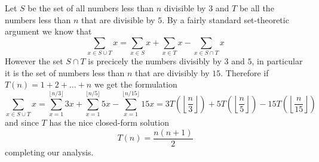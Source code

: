 Let $S$ be the set of all numbers less than $n$ divisible by $3$ and $T$ be all the numbers less than $n$ that are divisible by $5$.
By a fairly standard set-theoretic argument we know that
$$\sum_{x\in S\cup T} x=\sum_{x\in S} x+\sum_{x\in T} x-\sum_{x\in S\cap T} x$$
However the set $S\cap T$ is precicely the numbers divisibly by $3$ and $5$, in particular it is the set of numbers less than $n$ that
are divisibly by $15$. Therefore if $T(n)=1+2+\dots+n$ we get the formulation
$$\sum_{x\in S\cup T} x=\sum_{x=1}^{\lfloor n/3\rfloor} 3x+\sum_{x=1}^{\lfloor n/5\rfloor} 5x-\sum_{x=1}^{\lfloor n/15\rfloor} 15x=3T\left(\left\lfloor\frac{n}{3}\right\rfloor\right)+5T\left(\left\lfloor\frac{n}{5}\right\rfloor\right)-15T\left(\left\lfloor\frac{n}{15}\right\rfloor\right)$$
and since $T$ has the nice closed-form solution
$$T(n)=\frac{n(n+1)}{2}$$
completing our analysis.